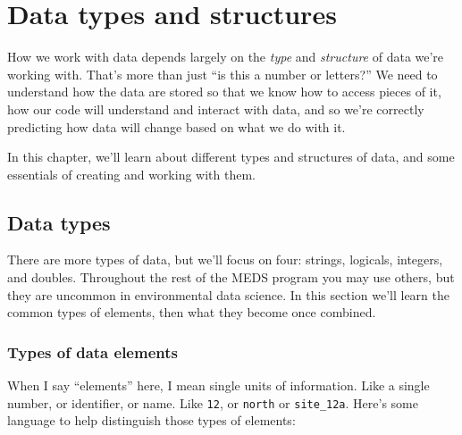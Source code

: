 \documentclass[
]{book}
\begin{document}
\hypertarget{types}{%
\chapter{Data types and structures}\label{types}}

How we work with data depends largely on the \emph{type} and \emph{structure} of data we're working with. That's more than just ``is this a number or letters?'' We need to understand how the data are stored so that we know how to access pieces of it, how our code will understand and interact with data, and so we're correctly predicting how data will change based on what we do with it.

In this chapter, we'll learn about different types and structures of data, and some essentials of creating and working with them.

\hypertarget{data-types}{%
\section{Data types}\label{data-types}}

There are more types of data, but we'll focus on four: strings, logicals, integers, and doubles. Throughout the rest of the MEDS program you may use others, but they are uncommon in environmental data science. In this section we'll learn the common types of elements, then what they become once combined.

\hypertarget{types-of-data-elements}{%
\subsection{Types of data elements}\label{types-of-data-elements}}

When I say ``elements'' here, I mean single units of information. Like a single number, or identifier, or name. Like \texttt{12}, or \texttt{north} or \texttt{site\_12a}. Here's some language to help distinguish those types of elements:
\end{document}

